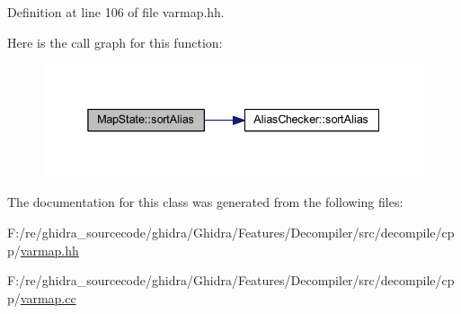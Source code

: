 Definition at line 106 of file varmap.\+hh.

Here is the call graph for this function\+:
\nopagebreak
\begin{figure}[H]
\begin{center}
\leavevmode
\includegraphics[width=338pt]{class_map_state_a609b3e862e2b69d179e2f500c59a0a53_cgraph}
\end{center}
\end{figure}


The documentation for this class was generated from the following files\+:\begin{DoxyCompactItemize}
\item 
F\+:/re/ghidra\+\_\+sourcecode/ghidra/\+Ghidra/\+Features/\+Decompiler/src/decompile/cpp/\mbox{\hyperlink{varmap_8hh}{varmap.\+hh}}\item 
F\+:/re/ghidra\+\_\+sourcecode/ghidra/\+Ghidra/\+Features/\+Decompiler/src/decompile/cpp/\mbox{\hyperlink{varmap_8cc}{varmap.\+cc}}\end{DoxyCompactItemize}
